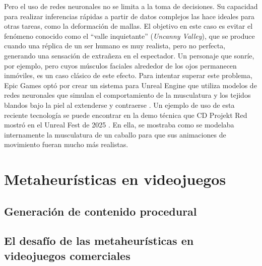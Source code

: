 Pero el uso de redes neuronales no se limita a la toma de decisiones. Su capacidad para realizar inferencias rápidas a partir de datos complejos las hace ideales para otras tareas, como la deformación de mallas. El objetivo en este caso es evitar el fenómeno conocido como el ``valle inquietante'' (\textit{Uncanny Valley}), que se produce cuando una réplica de un ser humano es muy realista, pero no perfecta, generando una sensación de extrañeza en el espectador. Un personaje que sonríe, por ejemplo, pero cuyos músculos faciales alrededor de los ojos permanecen inmóviles, es un caso clásico de este efecto. Para intentar superar este problema, Epic Games optó por crear un sistema para Unreal Engine que utiliza modelos de redes neuronales que simulan el comportamiento de la musculatura y los tejidos blandos bajo la piel al extenderse y contraerse \cite{epic_games_ml_2025}. Un ejemplo de uso de esta reciente tecnología se puede encontrar en la demo técnica que CD Projekt Red mostró en el Unreal Fest de 2025 \cite{cd_projekt_red_witcher_2025}. En ella, se mostraba como se modelaba internamente la musculatura de un caballo para que sus animaciones de movimiento fueran mucho más realistas.



\section{Metaheurísticas en videojuegos} \label{sec:estado_arte}
\subsection{Generación de contenido procedural}


\subsection{El desafío de las metaheurísticas en videojuegos comerciales}


